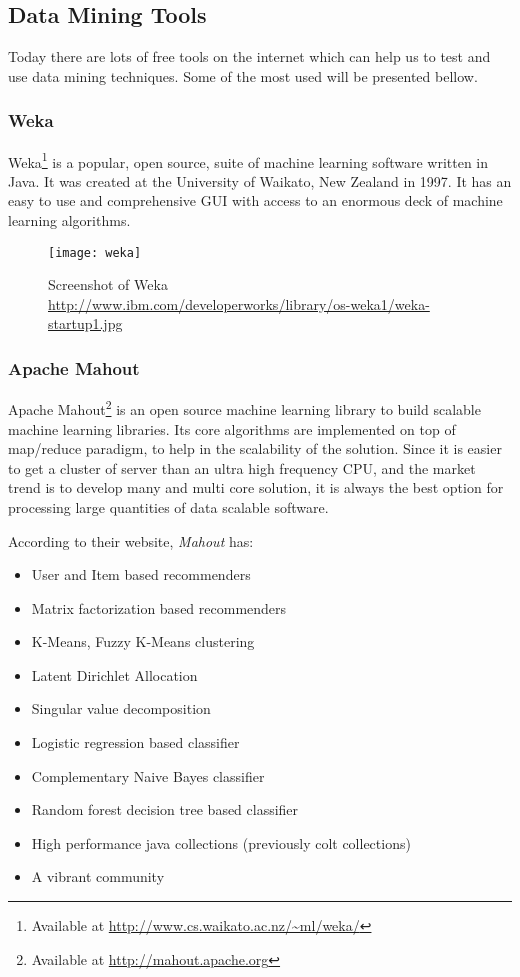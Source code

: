 \subsection{Data Mining Tools}
Today there are lots of free tools on the internet which can help us to test and use data mining techniques.
Some of the most used will be presented bellow.

\subsubsection{Weka}

Weka\footnote{ Available at \url{http://www.cs.waikato.ac.nz/~ml/weka/}} is a popular, open source, suite of machine learning software written in Java.
It was created at the University of Waikato, New Zealand in 1997. It has an easy to use and comprehensive GUI with access to an enormous deck of machine learning algorithms.

\begin{figure}[h]
  \begin{center}
    \leavevmode
    \texttt{[image: weka]}
    \caption{Screenshot of Weka \url{http://www.ibm.com/developerworks/library/os-weka1/weka-startup1.jpg}}
    \label{fig:RapidMiner}
  \end{center}
\end{figure}


\subsubsection{Apache Mahout}

Apache Mahout\footnote{ Available at \url{http://mahout.apache.org}} is an open source machine learning library to build scalable machine learning libraries.
Its core algorithms are implemented on top of map/reduce paradigm, to help in the scalability of the solution.
Since it is easier to get a cluster of server than an ultra high frequency CPU, and the market trend is to develop many and multi core solution, it is always the best option for processing large quantities of data scalable software.

According to their website, \emph{Mahout} has:
\begin{itemize}

\item User and Item based recommenders
\item Matrix factorization based recommenders
\item K-Means, Fuzzy K-Means clustering
\item Latent Dirichlet Allocation
\item Singular value decomposition
\item Logistic regression based classifier
\item Complementary Naive Bayes classifier
\item Random forest decision tree based classifier
\item High performance java collections (previously colt collections)
\item  A vibrant community

\end{itemize}

